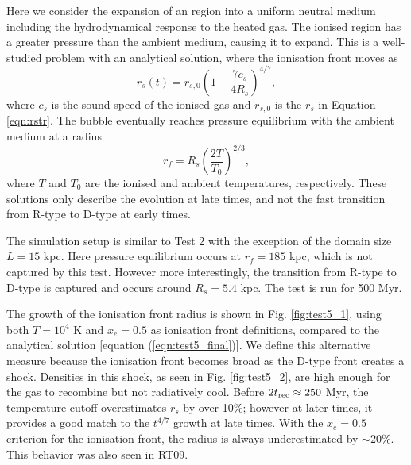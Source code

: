 \documentclass[useAMS,usenatbib]{mn2e}
\begin{document}
Here we consider the expansion of an \hii region into a uniform
neutral medium including the hydrodynamical response to the heated
gas.  The ionised region has a greater pressure than the ambient
medium, causing it to expand.  This is a well-studied problem
\citep{Spitzer78} with an analytical solution, where the ionisation
front moves as
%
\begin{equation}
  \label{eqn:test5_r}
  r_s(t) = r_{s,0} \left(1 + \frac{7c_s}{4R_s}\right)^{4/7},
\end{equation}
where $c_s$ is the sound speed of the ionised gas and $r_{s,0}$ is the
$r_s$ in Equation \ref{eqn:rstr}.  The bubble eventually reaches
pressure equilibrium with the ambient medium at a radius
%
\begin{equation}
  \label{eqn:test5_final}
  r_f = R_s \left(\frac{2T}{T_0}\right)^{2/3},
\end{equation}
where $T$ and $T_0$ are the ionised and ambient temperatures,
respectively.  These solutions only describe the evolution at late
times, and not the fast transition from R-type to D-type at early
times.

The simulation setup is similar to Test 2 with the exception of the
domain size $L = 15$ kpc.  Here pressure equilibrium occurs at $r_f =
185$ kpc, which is not captured by this test.  However more
interestingly, the transition from R-type to D-type is captured and
occurs around $R_s = 5.4$ kpc.  The test is run for 500 Myr.

The growth of the ionisation front radius is shown in Fig.
\ref{fig:test5_1}, using both $T = 10^4$ K and $x_e = 0.5$ as
ionisation front definitions, compared to the analytical solution
[equation (\ref{eqn:test5_final})].  We define this alternative
measure because the ionisation front becomes broad as the D-type front
creates a shock.  Densities in this shock, as seen in Fig.
\ref{fig:test5_2}, are high enough for the gas to recombine but not
radiatively cool.  Before $2t_{\rm rec} \approx 250$ Myr, the
temperature cutoff overestimates $r_s$ by over 10\%; however at later
times, it provides a good match to the $t^{4/7}$ growth at late times.
With the $x_e = 0.5$ criterion for the ionisation front, the radius is
always underestimated by $\sim20\%$.  This behavior was also seen in
RT09.
\end{document}
